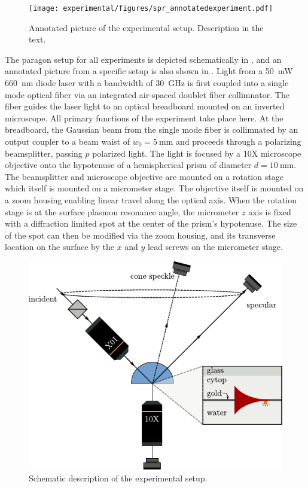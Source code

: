 \begin{figure}[ht]
 \centering
 \texttt{[image: experimental/figures/spr\_annotatedexperiment.pdf]}
 \caption{Annotated picture of the experimental setup.  Description in the
	text.}
 \label{fig:experimentalpicture}
\end{figure}

The paragon setup for all experiments is depicted schematically in
, and an annotated picture from a specific
setup is also shown in .  Light from a
\SI{50}{\milli\watt} \SI{660}{\nano\meter} diode laser with a bandwidth of
\SI{30}{\giga\hertz} is first coupled into a single mode optical fiber via
an integrated air-spaced doublet fiber collimnator.  The fiber guides the
laser light to an optical breadboard mounted on an inverted microscope.
All primary functions of the experiment take place here.  At the
breadboard, the Gaussian beam from the single mode fiber is collimnated by
an output coupler to a beam waist of $w_0=\SI{5}{\milli\meter}$ and
proceeds through a polarizing beamsplitter, passing $p$ polarized light.
The light is focused by a 10X microscope objective onto the hypotenuse of a
hemispherical prism of diameter $d=\SI{10}{\milli\meter}$.  The
beamsplitter and microscope objective are mounted on a rotation stage which
itself is mounted on a micrometer stage.  The objective itself is mounted
on a zoom housing enabling linear travel along the optical axis.  When the
rotation stage is at the surface plasmon resonance angle, the micrometer
$z$ axis is fixed with a diffraction limited spot at the center of the
prism's hypotenuse.  The size of the spot can then be modified via the zoom
housing, and its transverse location on the surface by the $x$ and $y$ lead
screws on the micrometer stage.  

\begin{figure}[ht]
\centering
 \includegraphics[keepaspectratio]{experimental/figures/conefig.pdf}
	\caption{Schematic description of the experimental setup.}
 \label{fig:experimentalsetup}
\end{figure}


